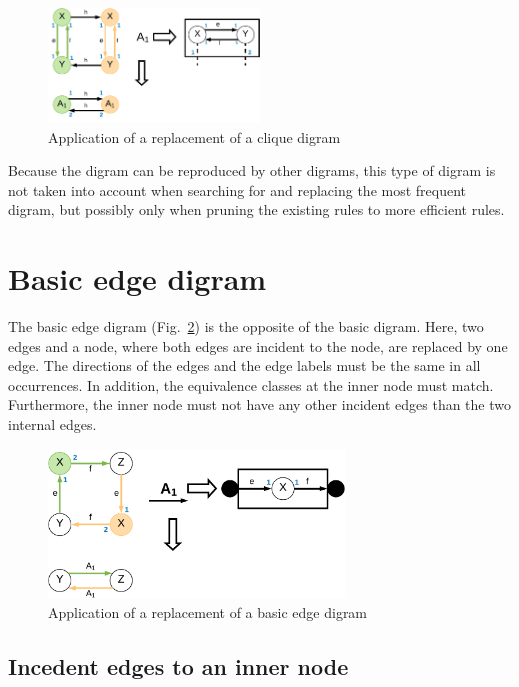 \documentclass[a4paper]{scrartcl}
\begin{document}
\begin{figure}[h]
	\centering
	\includegraphics[width=0.5\textwidth]{img/cliqueDigram}
	\caption{Application of a replacement of a clique digram}
	\label{fig:cliqueDigram}
\end{figure}
Because the digram can be reproduced by other digrams, this type of digram is not taken into account when searching for and replacing the most frequent digram, but possibly only when pruning the existing rules to more efficient rules.



\section{Basic edge digram}
\label{sec:basicEdgeDigram}


The basic edge digram (Fig.~\ref{fig:basicEdgeDigram}) is the opposite of the basic digram.
Here, two edges and a node, where both edges are incident to the node, are replaced by one edge. The directions of the edges and the edge labels must be the same in all occurrences. In addition, the equivalence classes at the inner node must match. Furthermore, the inner node must not have any other incident edges than the two internal edges. 

\begin{figure}[h]
	\centering
	\includegraphics[width=0.7\textwidth]{img/basicEdgeDigram}
	\caption{Application of a replacement of a basic edge digram}
	\label{fig:basicEdgeDigram}
\end{figure}


\subsection*{Incedent edges to an inner node}
\label{sec:incedentEdges}
\end{document}
